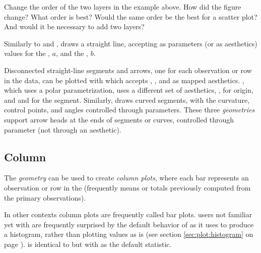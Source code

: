 \documentclass[krantz2]{krantz}\usepackage{knitr}
\begin{document}
\begin{playground}
  Change the order of the two layers in the example above. How did the figure change? What order is best? Would the same order be the best for a scatter plot? And would it be necessary to add two  layers?
\end{playground}

Similarly to  and ,  draws a straight line, accepting as parameters (or as aesthetics) values for the , $a$, and the , $b$.

Disconnected straight-line segments and arrows, one for each observation or row in the data, can be plotted with  which accepts , ,  and  as mapped aesthetics. , which uses a polar parametrization, uses a different set of aesthetics, ,  for origin, and  and  for the segment. Similarly,  draws curved segments, with the curvature, control points, and angles controlled through parameters. These three \emph{geometries} support arrow heads at the ends of segments or curves, controlled through parameter  (not through an aesthetic).

\subsection{Column}\label{sec:plot:col}

The \emph{geometry}  can be used to create \emph{column plots}, where each bar represents an observation or row in the  (frequently means or totals previously computed from the primary observations).

\begin{warningbox}
In other contexts column plots are frequently called bar plots. \Rlang users not familiar yet with \ggplot are frequently surprised by the default behavior of  as it uses  to produce a histogram, rather than plotting values as is (see section \ref{sec:plot:histogram} on page \pageref{sec:plot:histogram}).  is identical to  but with  as the default statistic.
\end{warningbox}
\end{document}
